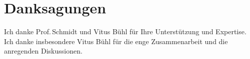 \documentclass[oneside,12pt,a4paper]{report}
\begin{document}
\newpage

\section*{Danksagungen}

Ich danke Prof.\,Schmidt und Vitus Bühl für Ihre Unterstützung und Expertise. Ich danke insbesondere Vitus Bühl für die enge Zusammenarbeit und die anregenden Diskussionen.

\cleardoublepage


\renewcommand{\baselinestretch}{1.3}
\small\normalsize

\tableofcontents

\renewcommand{\baselinestretch}{1}
\small\normalsize

\cleardoublepage


\setcounter{page}{1}


\cleardoublepage


\cleardoublepage


\cleardoublepage


\cleardoublepage



%
%

\renewcommand{\bibname}{Literaturverzeichnis}
\printbibliography

\end{document}
